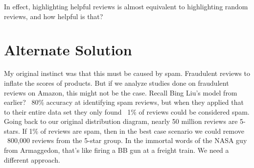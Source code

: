 \documentclass[a4paper,11pt]{article}
\begin{document}
In effect, highlighting helpful reviews is almost equivalent to highlighting random reviews, and how helpful is that?

\section*{Alternate Solution}
My original instinct was that this must be caused by spam. Fraudulent reviews to inflate the scores of products. But if we analyze studies done on fraudulent reviews on Amazon, this might not be the case. Recall Bing Liu's model from earlier? ~80\% accuracy at identifying spam reviews, but when they applied that to their entire data set they only found ~1\% of reviews could be considered spam. Going back to our original distribution diagram, nearly 50 million reviews are 5-stars. If 1\% of reviews are spam, then in the best case scenario we could remove ~800,000 reviews from the 5-star group. In the immortal words of the NASA guy from Armaggedon, that's like firing a BB gun at a freight train. We need a different approach.
\end{document}
